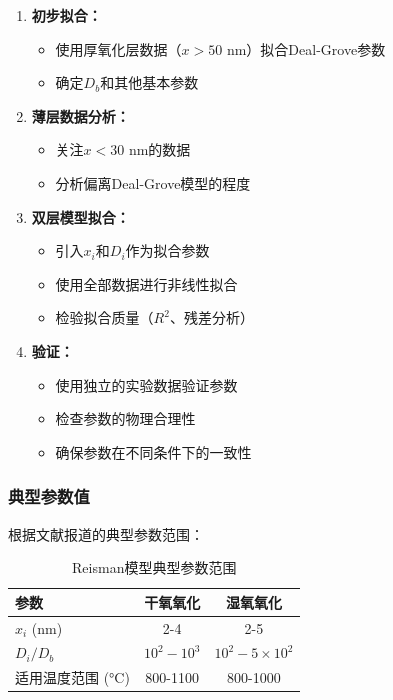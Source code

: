 \documentclass[UTF8,12pt,a4paper]{ctexart}
\begin{document}
\begin{enumerate}
    \item \textbf{初步拟合：}
    \begin{itemize}
        \item 使用厚氧化层数据（$x > 50$ nm）拟合Deal-Grove参数
        \item 确定$D_b$和其他基本参数
    \end{itemize}
    
    \item \textbf{薄层数据分析：}
    \begin{itemize}
        \item 关注$x < 30$ nm的数据
        \item 分析偏离Deal-Grove模型的程度
    \end{itemize}
    
    \item \textbf{双层模型拟合：}
    \begin{itemize}
        \item 引入$x_i$和$D_i$作为拟合参数
        \item 使用全部数据进行非线性拟合
        \item 检验拟合质量（$R^2$、残差分析）
    \end{itemize}
    
    \item \textbf{验证：}
    \begin{itemize}
        \item 使用独立的实验数据验证参数
        \item 检查参数的物理合理性
        \item 确保参数在不同条件下的一致性
    \end{itemize}
\end{enumerate}

\subsubsection{典型参数值}

根据文献报道的典型参数范围：

\begin{table}[h]
\centering
\begin{tabular}{|l|c|c|}
\hline
\textbf{参数} & \textbf{干氧氧化} & \textbf{湿氧氧化} \\
\hline
$x_i$ (nm) & 2-4 & 2-5 \\
\hline
$D_i/D_b$ & $10^2 - 10^3$ & $10^2 - 5\times10^2$ \\
\hline
适用温度范围 (°C) & 800-1100 & 800-1000 \\
\hline
\end{tabular}
\caption{Reisman模型典型参数范围}
\end{table}
\end{document}

